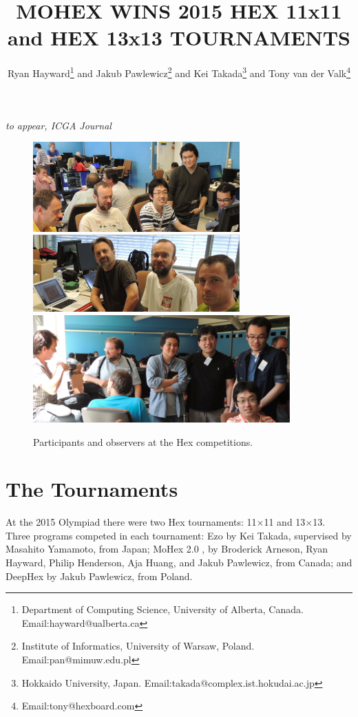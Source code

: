 \documentclass{icga}
\title{\sc MOHEX WINS 2015 HEX 11x11 and HEX 13x13 TOURNAMENTS}
\author{Ryan Hayward\thanks{Department 
of Computing Science, University of Alberta, Canada. Email:hayward@ualberta.ca} and
Jakub Pawlewicz\thanks{Institute of Informatics, University of Warsaw, Poland. Email:pan@mimuw.edu.pl} and
Kei Takada\thanks{Hokkaido University, Japan. Email:takada@complex.ist.hokudai.ac.jp} and
Tony van der Valk\thanks{Email:tony@hexboard.com}
}
\affiliation{Edmonton, Canada}
\def\Dx{\mbox{\sc DeepHex}}
\def\Eo{\mbox{\sc Ezo}}
\def\Mx{\mbox{\sc MoHex}}
\begin{document}
\maketitle

\vspace*{-2.25in}
{\it to appear, ICGA Journal}
\vspace*{2.0in}

\begin{figure}[hbt]
\includegraphics[width=225pt]{edo0.eps}\
\includegraphics[width=225pt]{rjt2.eps}\\

\hfill\includegraphics[width=280pt]{mas.eps}\hfill~
\caption{Participants and observers at the Hex competitions.}
\end{figure}


\section{The Tournaments}
At the 2015 Olympiad there were
two Hex tournaments: 11$\times$11 and 13$\times$13.
Three programs competed in each tournament:
\Eo{} 
by Kei Takada, supervised by Masahito Yamamoto, from Japan;
\Mx{} 2.0 , 
by Broderick Arneson, Ryan Hayward, Philip Henderson, Aja Huang, and Jakub Pawlewicz,
from Canada;
and
\Dx{}
by Jakub Pawlewicz, 
from Poland.
\end{document}
